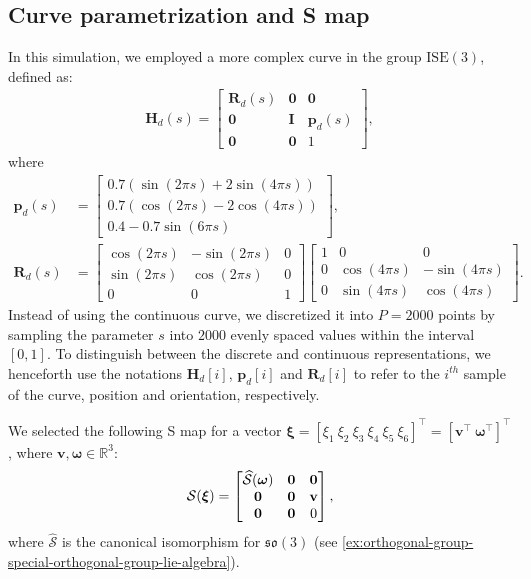 \subsection{Curve parametrization and S map}
In this simulation, we employed a more complex curve in the group $\text{ISE}(3)$, defined as:
\begin{align}
    \mathbf{H}_d(s) = \begin{bmatrix}
        \mathbf{R}_d(s) & \mathbf{0} & \mathbf{0}\\
        \mathbf{0} & \mathbf{I} & \mathbf{p}_d(s)\\
        \mathbf{0} & \mathbf{0} & 1
    \end{bmatrix},\label{eq:parametriceq-simulation}
\end{align}
where
\begin{align}
    \mathbf{p}_d(s) &= \begin{bmatrix}
        0.7(\sin(2\pi s) + 2\sin(4\pi s))\\
        0.7(\cos(2\pi s) - 2\cos(4\pi s))\\
        0.4 - 0.7\sin(6\pi s)
    \end{bmatrix},\\
    \mathbf{R}_d(s) &= \begin{bmatrix}
        \cos(2\pi s) & -\sin(2\pi s) & 0\\
        \sin(2\pi s) & \cos(2\pi s) & 0\\
        0 & 0 & 1
    \end{bmatrix}\begin{bmatrix}
        1 & 0 & 0\\
        0 & \cos(4\pi s) & -\sin(4\pi s)\\
        0 & \sin(4\pi s) & \cos(4\pi s)
    \end{bmatrix}.
\end{align}
Instead of using the continuous curve, we discretized it into $P=\num{2000}$ points by sampling the parameter $s$ into $\num{2000}$ evenly spaced values within the interval $[0, 1]$. To distinguish between the discrete and continuous representations, we henceforth use the notations $\mathbf{H}_d[i]$, $\mathbf{p}_d[i]$ and $\mathbf{R}_d[i]$ to refer to the $i^{th}$ sample of the curve, position and orientation, respectively.

We selected the following S map for a vector $\boldsymbol{\xi}=[\xi_1\ \xi_2\ \xi_3\ \xi_4\ \xi_5\ \xi_6]^\top=[\mathbf{v}^\top\ \boldsymbol{\omega}^\top]^\top$, where $\mathbf{v},\boldsymbol{\omega}\in\mathbb{R}^3$:
\begin{align}
    \SL[\boldsymbol{\xi}] = \begin{bmatrix}
        \widehat{\mathcal{S}}(\boldsymbol{\omega}) & \mathbf{0} & \mathbf{0}\\
        \mathbf{0} & \mathbf{0} & \mathbf{v}\\
        \mathbf{0} & \mathbf{0} & 0
    \end{bmatrix},
\end{align}
where $\widehat{\mathcal{S}}$ is the canonical isomorphism for $\mathfrak{so}(3)$ (see \cref{ex:orthogonal-group-special-orthogonal-group-lie-algebra}).
